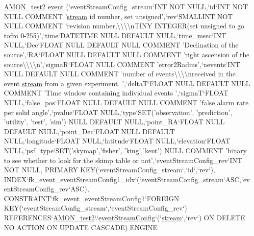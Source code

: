 \begin{DoxyCompactItemize}
\hyperlink{db__mc__build_8sql_a19c21c59303d8b6591b92240ff7de1d5}{A\-M\-O\-N\-\_\-test2} \hyperlink{db__mc__build_8sql_acbd1fd683d4ac62d62bece4d450f6bb0}{event} (`event\-Stream\-Config\-\_\-stream`I\-N\-T N\-O\-T N\-U\-L\-L,`id`I\-N\-T N\-O\-T N\-U\-L\-L C\-O\-M\-M\-E\-N\-T '\hyperlink{db__mc__build_8sql_a67b7e9fc922cbf49b5ae3124240f4188}{stream} id number, set unsigned',`rev`S\-M\-A\-L\-L\-I\-N\-T N\-O\-T N\-U\-L\-L C\-O\-M\-M\-E\-N\-T 'revision number,\textbackslash{}\textbackslash{}\textbackslash{}\textbackslash{}n\-T\-I\-N\-Y I\-N\-T\-E\-G\-E\-R(set unsigned to go tofro 0-\/255)',`time`D\-A\-T\-E\-T\-I\-M\-E N\-U\-L\-L D\-E\-F\-A\-U\-L\-T N\-U\-L\-L,`time\-\_\-msec`I\-N\-T N\-U\-L\-L,`Dec`F\-L\-O\-A\-T N\-U\-L\-L D\-E\-F\-A\-U\-L\-T N\-U\-L\-L C\-O\-M\-M\-E\-N\-T 'Declination of the \hyperlink{db__mc__build_8sql_a2da1ba01fa2a751239f57c1c5fbcecc8}{source}',`R\-A`F\-L\-O\-A\-T N\-U\-L\-L D\-E\-F\-A\-U\-L\-T N\-U\-L\-L C\-O\-M\-M\-E\-N\-T 'right ascension of the source\textbackslash{}\textbackslash{}\textbackslash{}\textbackslash{}n',`sigma\-R`F\-L\-O\-A\-T N\-U\-L\-L C\-O\-M\-M\-E\-N\-T 'error2\-Radius',`nevents`I\-N\-T N\-U\-L\-L D\-E\-F\-A\-U\-L\-T N\-U\-L\-L C\-O\-M\-M\-E\-N\-T 'number of events\textbackslash{}\textbackslash{}\textbackslash{}\textbackslash{}nreceived in the event \hyperlink{db__mc__build_8sql_a67b7e9fc922cbf49b5ae3124240f4188}{stream} from a given experiment. ',`delta\-T`F\-L\-O\-A\-T N\-U\-L\-L D\-E\-F\-A\-U\-L\-T N\-U\-L\-L C\-O\-M\-M\-E\-N\-T 'Time window containing individual events ',`sigma\-T`F\-L\-O\-A\-T N\-U\-L\-L,`false\-\_\-pos`F\-L\-O\-A\-T N\-U\-L\-L D\-E\-F\-A\-U\-L\-T N\-U\-L\-L C\-O\-M\-M\-E\-N\-T 'false alarm rate per solid angle',`pvalue`F\-L\-O\-A\-T N\-U\-L\-L,`type`S\-E\-T('observation', 'prediction', 'utility', 'test', 'sim') N\-U\-L\-L D\-E\-F\-A\-U\-L\-T N\-U\-L\-L,`point\-\_\-\-R\-A`F\-L\-O\-A\-T N\-U\-L\-L D\-E\-F\-A\-U\-L\-T N\-U\-L\-L,`point\-\_\-\-Dec`F\-L\-O\-A\-T N\-U\-L\-L D\-E\-F\-A\-U\-L\-T N\-U\-L\-L,`longitude`F\-L\-O\-A\-T N\-U\-L\-L,`latitude`F\-L\-O\-A\-T N\-U\-L\-L,`elevation`F\-L\-O\-A\-T N\-U\-L\-L,`psf\-\_\-type`S\-E\-T('skymap','fisher', 'king','kent') N\-U\-L\-L C\-O\-M\-M\-E\-N\-T 'binary to see whether to look for the skimp table or not',`event\-Stream\-Config\-\_\-rev`I\-N\-T N\-O\-T N\-U\-L\-L, P\-R\-I\-M\-A\-R\-Y K\-E\-Y(`event\-Stream\-Config\-\_\-stream`,`id`,`rev`), I\-N\-D\-E\-X`fk\-\_\-event\-\_\-event\-Stream\-Config1\-\_\-idx`(`event\-Stream\-Config\-\_\-stream`A\-S\-C,`event\-Stream\-Config\-\_\-rev`A\-S\-C), C\-O\-N\-S\-T\-R\-A\-I\-N\-T`fk\-\_\-event\-\_\-event\-Stream\-Config1`F\-O\-R\-E\-I\-G\-N K\-E\-Y(`event\-Stream\-Config\-\_\-stream`,`event\-Stream\-Config\-\_\-rev`) R\-E\-F\-E\-R\-E\-N\-C\-E\-S`\hyperlink{db__mc__build_8sql_a19c21c59303d8b6591b92240ff7de1d5}{A\-M\-O\-N\-\_\-test2}`.`\hyperlink{db__mc__build_8sql_a2932d2685911e3e53938c3498b7f53b9}{event\-Stream\-Config}`(`\hyperlink{db__mc__build_8sql_a67b7e9fc922cbf49b5ae3124240f4188}{stream}`,`rev`) O\-N D\-E\-L\-E\-T\-E N\-O A\-C\-T\-I\-O\-N O\-N U\-P\-D\-A\-T\-E C\-A\-S\-C\-A\-D\-E) E\-N\-G\-I\-N\-E

\end{DoxyCompactItemize}
